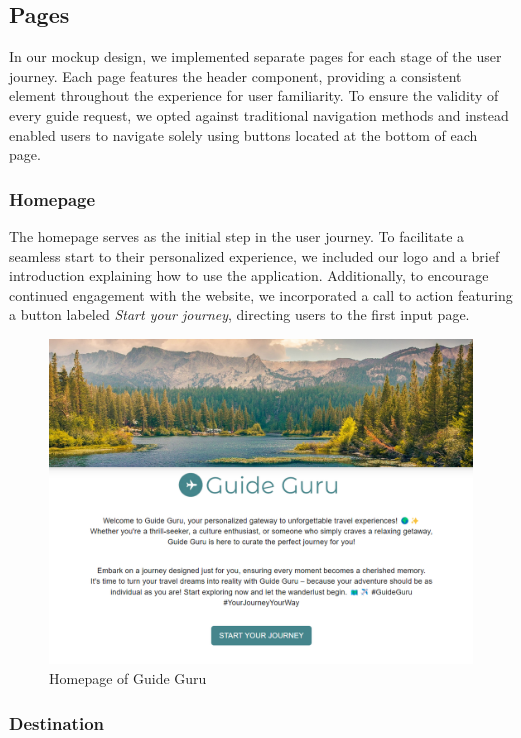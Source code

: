 \documentclass[english,notitlepage,smartquotes]{hgbreport}
\begin{document}
\subsection{Pages}

In our mockup design, we implemented separate pages for each stage of the user journey. Each page features the header component, providing a consistent element throughout the experience for user familiarity. To ensure the validity of every guide request, we opted against traditional navigation methods and instead enabled users to navigate solely using buttons located at the bottom of each page.

\subsubsection{Homepage}

The homepage serves as the initial step in the user journey. To facilitate a seamless start to their personalized experience, we included our logo and a brief introduction explaining how to use the application. Additionally, to encourage continued engagement with the website, we incorporated a call to action featuring a button labeled \textit{Start your journey}, directing users to the first input page.

\begin{figure}
	\centering
	\includegraphics[width=1\textwidth]{Homepage.png}
	\caption{Homepage of Guide Guru}
\end{figure}

\subsubsection{Destination}\label{DestinationPage}
\end{document}
